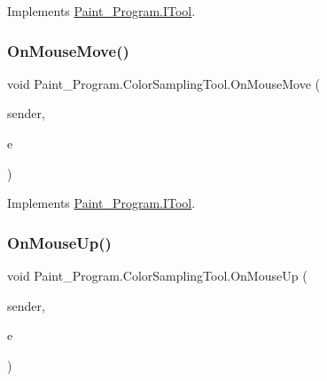 Implements \mbox{\hyperlink{interface_paint___program_1_1_i_tool_a73d8797f4f2b1e0d8efe8aadcd44e840}{Paint\+\_\+\+Program.\+I\+Tool}}.

\mbox{\label{class_paint___program_1_1_color_sampling_tool_a509ae51233092f2722e44301897ee085}} 
\subsubsection{\texorpdfstring{On\+Mouse\+Move()}{OnMouseMove()}}
{\footnotesize\ttfamily void Paint\+\_\+\+Program.\+Color\+Sampling\+Tool.\+On\+Mouse\+Move (\begin{DoxyParamCaption}\item[{object}]{sender,  }\item[{Mouse\+Event\+Args}]{e }\end{DoxyParamCaption})\hspace{0.3cm}{\ttfamily [inline]}}



Implements \mbox{\hyperlink{interface_paint___program_1_1_i_tool_a6a1cbe840b5cfc8a9b9463cc21590845}{Paint\+\_\+\+Program.\+I\+Tool}}.

\mbox{\label{class_paint___program_1_1_color_sampling_tool_a3365d954290cfb30d73c8a7c50fa7b72}} 
\subsubsection{\texorpdfstring{On\+Mouse\+Up()}{OnMouseUp()}}
{\footnotesize\ttfamily void Paint\+\_\+\+Program.\+Color\+Sampling\+Tool.\+On\+Mouse\+Up (\begin{DoxyParamCaption}\item[{object}]{sender,  }\item[{Mouse\+Event\+Args}]{e }\end{DoxyParamCaption})\hspace{0.3cm}{\ttfamily [inline]}}



